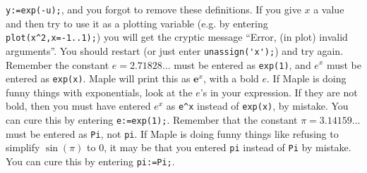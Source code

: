 \documentclass{amsart}
\begin{document}
\begin{itemize}
  \verb~y:=exp(-u);~, and you forgot to remove these
  definitions.  
%
  If you give $x$ a value and then try to use it as a
  plotting variable (e.g. by entering
  \verb~plot(x^2,x=-1..1);~) you will get the cryptic message
  ``Error, (in plot) invalid arguments''.  You should
  restart (or just enter \verb~unassign('x');~) and try again. 
%
  Remember the constant $e=2.71828\dots$ must be
  entered as \verb~exp(1)~, and $e^x$ must be entered as
  \verb~exp(x)~.  Maple will print this as $\textbf{e}^x$,
  with a bold $e$.  If Maple is doing funny things with
  exponentials, look at the $e$'s in your expression.  If
  they are not bold, then you must have entered $e^x$ as
  \verb~e^x~ instead of \verb~exp(x)~, by mistake.  You can
  cure this by entering \verb~e:=exp(1);~. 
%
  Remember that the constant
  $\pi=3.14159\dots$ must be 
  entered as \verb~Pi~, not \verb~pi~.  If Maple is doing
  funny things like refusing to simplify $\sin(\pi)$ to $0$,
  it may be that you entered \verb~pi~ instead of \verb~Pi~
  by mistake.  You can cure this by entering \verb~pi:=Pi;~. 
\end{itemize}
\end{document}
